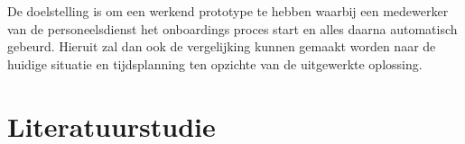 De doelstelling is om een werkend prototype te hebben waarbij een medewerker van de personeelsdienst het onboardings proces start en alles daarna automatisch gebeurd. Hieruit zal dan ook de vergelijking kunnen gemaakt worden naar de huidige situatie en tijdsplanning ten opzichte van de uitgewerkte oplossing.




\section{Literatuurstudie}%
\label{sec:literatuurstudie}








